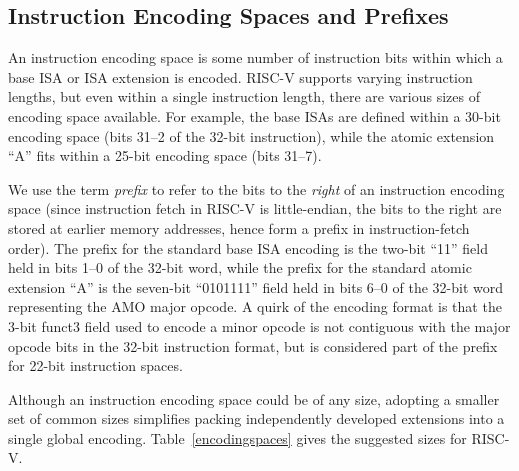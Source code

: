 \vspace{-0.2in}
\subsection*{Instruction Encoding Spaces and Prefixes}

An instruction encoding space is some number of instruction bits
within which a base ISA or ISA extension is encoded.  RISC-V supports
varying instruction lengths, but even within a single instruction
length, there are various sizes of encoding space available.  For
example, the base ISAs are defined within a 30-bit encoding space (bits
31--2 of the 32-bit instruction), while the atomic extension ``A''
fits within a 25-bit encoding space (bits 31--7).

We use the term {\em prefix} to refer to the bits to the {\em right}
of an instruction encoding space (since instruction fetch in RISC-V is
little-endian, the
bits to the right are stored at earlier memory addresses, hence form a
prefix in instruction-fetch order).  The prefix for the standard base
ISA encoding is the two-bit ``11'' field held in bits 1--0 of the
32-bit word, while the prefix for the standard atomic extension ``A''
is the seven-bit ``0101111'' field held in bits 6--0 of the 32-bit
word representing the AMO major opcode.  A quirk of the encoding
format is that the 3-bit funct3 field used to encode a minor opcode is
not contiguous with the major opcode bits in the 32-bit instruction
format, but is considered part of the prefix for 22-bit instruction
spaces.

Although an instruction encoding space could be of any size, adopting
a smaller set of common sizes simplifies packing independently
developed extensions into a single global encoding.
Table~\ref{encodingspaces} gives the suggested sizes for RISC-V.

